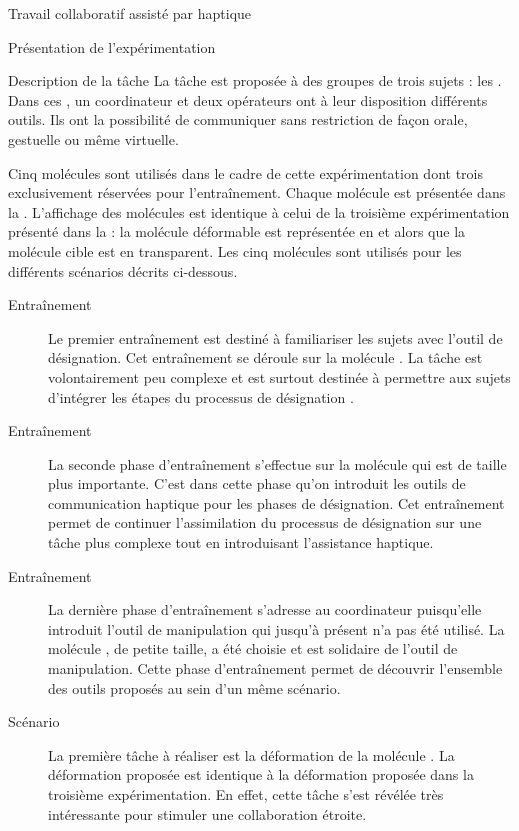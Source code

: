 \documentclass[myfrancais,ngerman,english,french]{mythesis}
\begin{document}
\begin{mychapter}{Travail collaboratif assisté par haptique}
\begin{mysection}{Présentation de l'expérimentation}
\begin{mysubsection}{Description de la tâche}
				La tâche est proposée à des groupes de trois sujets : les .
				Dans ces , un \og coordinateur \fg et deux \og opérateurs \fg ont à leur disposition différents outils.
				Ils ont la possibilité de communiquer sans restriction de façon orale, gestuelle ou même virtuelle.

				Cinq molécules sont utilisés dans le cadre de cette expérimentation dont trois exclusivement réservées pour l'entraînement.
				Chaque molécule est présentée dans la .
				L'affichage des molécules est identique à celui de la troisième expérimentation présenté dans la  : la molécule déformable est représentée en \myCPK et \myNewRibbon alors que la molécule cible est en \myNewRibbon transparent.
				Les cinq molécules sont utilisés pour les différents scénarios décrits ci-dessous.
				\begin{description}
					\item[Entraînement~]
						Le premier entraînement est destiné à familiariser les sujets avec l'outil de désignation.
						Cet entraînement se déroule sur la molécule \myTRPCAGE.
						La tâche est volontairement peu complexe et est surtout destinée à permettre aux sujets d'intégrer les étapes du processus de désignation .
					\item[Entraînement~]
						La seconde phase d'entraînement s'effectue sur la molécule \myPrion qui est de taille plus importante.
						C'est dans cette phase qu'on introduit les outils de communication haptique pour les phases de désignation.
						Cet entraînement permet de continuer l'assimilation du processus de désignation sur une tâche plus complexe tout en introduisant l'assistance haptique.
					\item[Entraînement~]
						La dernière phase d'entraînement s'adresse au coordinateur puisqu'elle introduit l'outil de manipulation qui jusqu'à présent n'a pas été utilisé.
						La molécule \myTRPZIPPER, de petite taille, a été choisie et est solidaire de l'outil de manipulation.
						Cette phase d'entraînement permet de découvrir l'ensemble des outils proposés au sein d'un même scénario.
					\item[Scénario~]
						La première tâche à réaliser est la déformation de la molécule \myUbiquitin.
						La déformation proposée est identique à la déformation proposée dans la troisième expérimentation.
						En effet, cette tâche s'est révélée très intéressante pour stimuler une collaboration étroite.

\end{description}
\end{mysubsection}
\end{mysection}
\end{mychapter}
\end{document}
